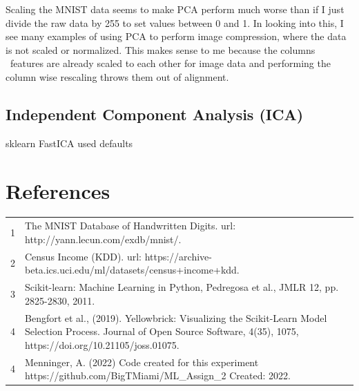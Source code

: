 \documentclass[letterpaper]{article} %
\begin{document}
Scaling the MNIST data seems to make PCA perform much worse than if I just divide the raw data by 255 to set values between 0 and 1.  In looking into this, I see many examples of using PCA to perform image compression, where the data is not scaled or normalized.    This makes sense to me because the columns \ features are already scaled to each other for image data and performing the column wise rescaling throws them out of alignment.

\subsection{Independent Component Analysis (ICA)}

sklearn FastICA used defaults

\section{References}
\begin{tabular}{l p{2.75in}}
\\
1 & The MNIST Database of Handwritten Digits. url: http://yann.lecun.com/exdb/mnist/.
\\
2 & Census Income (KDD). url: https://archive-beta.ics.uci.edu/ml/datasets/census+income+kdd.
\\
3 & Scikit-learn: Machine Learning in Python, Pedregosa et al., JMLR 12, pp. 2825-2830, 2011.
\\
4 & Bengfort et al., (2019). Yellowbrick: Visualizing the Scikit-Learn Model Selection Process. Journal of Open Source Software, 4(35), 1075, https://doi.org/10.21105/joss.01075.
\\
4 & Menninger, A. (2022)  Code created for this experiment https://github.com/BigTMiami/ML\_Assign\_2  Created: 2022.
\end{tabular}
\end{document}
